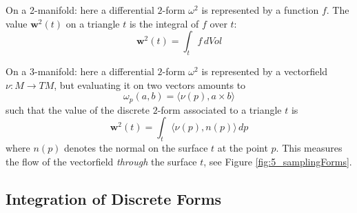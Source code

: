 On a 2-manifold: here a differential $2$-form $\omega^2$ is represented by a function $f$. The value $\textbf{w}^2(t)$ on a triangle $t$ is the integral of $f$ over $t$:
\[\textbf{w}^2(t)= \int_{t} f\, dVol\]

On a 3-manifold: here a differential $2$-form $\omega^2$ is represented by a vectorfield $\nu: M\to TM$, but evaluating it on two vectors amounts to
\[\omega_p(a,b) = \langle \nu(p) , a \times b \rangle\]
such that the value of the discrete $2$-form associated to a triangle $t$ is
\[\textbf{w}^2(t)= \int_{t} \langle \nu(p), n(p) \rangle \, dp\]
where $n(p)$ denotes the normal on the surface $t$ at the point $p$. This measures the flow of the vectorfield \emph{through} the surface $t$, see Figure \ref{fig:5_samplingForms}.


%


\subsection{Integration of Discrete Forms}

